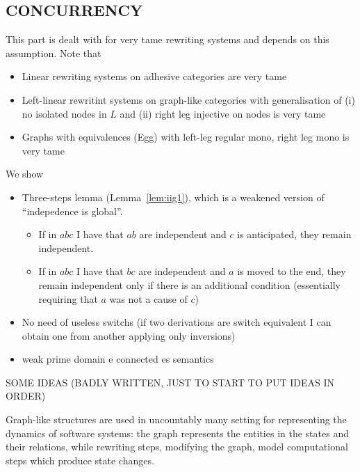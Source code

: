 \subsection*{CONCURRENCY}

This part is dealt with for very tame rewriting systems and depends on this assumption. Note that
\begin{itemize}
	\item Linear rewriting systems on adhesive categories are very tame
	\item Left-linear rewritint systems on graph-like categories with generalisation of (i) no isolated nodes in $L$ and (ii) right leg injective on nodes is very tame
	\item Graphs with equivalences (Egg) with left-leg regular mono, right leg mono is very tame
\end{itemize}

We show
\begin{itemize}
	
	
	\item Three-steps lemma (Lemma~\ref{lem:iig1}), which is a weakened version of ``indepedence is global''.
	\begin{itemize}
		
		\item If in $abc$ I have that $ab$ are independent and $c$ is anticipated, they remain independent.
		\item  If in $abc$ I have that $bc$ are independent and $a$ is moved to the end, they remain independent only if there is an additional condition (essentially requiring that $a$ was not a cause of $c$)
	\end{itemize}
	
	
	
	\item No need of useless switchs (if two derivations are switch equivalent I can obtain one from another applying only inversions)
	
	\item weak prime domain e connected es semantics
\end{itemize}



SOME IDEAS (BADLY WRITTEN, JUST TO START TO PUT IDEAS IN ORDER)

Graph-like structures are used in uncountably many setting for representing the dynamics of software systems: the graph represents the entities in the states and their relations, while rewriting steps, modifying the graph, model computational steps which produce state changes.

